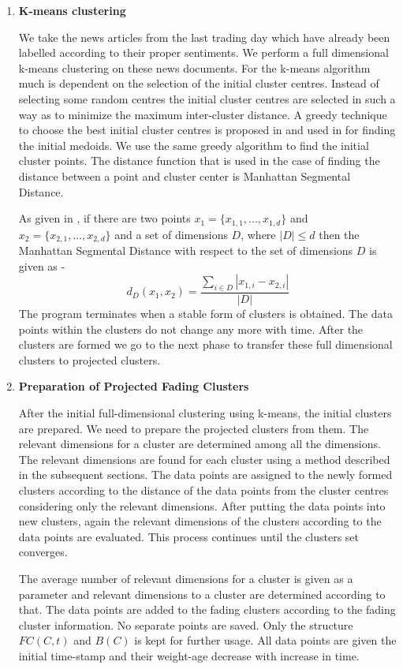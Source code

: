 \documentclass[a4paper,12bp]{report}
\begin{document}
\begin{enumerate}
\item \textbf{K-means clustering}

We take the news articles from the last trading day which have already been labelled according to their proper sentiments. We perform a full dimensional k-means clustering on these news documents. For the k-means algorithm much is dependent on the selection of the initial cluster centres. Instead of selecting some random centres the initial cluster centres are selected in such a way as to minimize the maximum inter-cluster distance. A greedy technique to choose the best initial cluster centres is proposed in \cite{Gonzalez:1985} and used in \cite{Aggarwal:1999} for finding the initial medoids. We use the same greedy algorithm to find the initial cluster points. The distance function that is used in the case of finding the distance between a point and cluster center is Manhattan Segmental Distance. 

As given in \cite{Aggarwal:1999}, if there are two points $x_{1} =\{ x_{1,1}, ..., x_{1,d}\}$ and $x_{2} =\{ x_{2,1}, ..., x_{2,d}\}$ and a set of dimensions $D$, where $|D| \leq d$ then the Manhattan Segmental Distance with respect to the set of dimensions $D$ is given as - 
\begin{equation}
\label{eq:manhattan_seg_distance}
d_{D}(x_1, x_2) = \frac{\sum_{i \in D} |x_{1,i} - x_{2,i}|}{|D|}
\end{equation}
The program terminates when a stable form of clusters is obtained. The data points within the clusters do not change any more with time. After the clusters are formed we go to the next phase to transfer these full dimensional clusters to projected clusters. 

\item \textbf{Preparation of Projected Fading Clusters}

After the initial full-dimensional clustering using k-means, the initial clusters are prepared. We need to prepare the projected clusters from them. The relevant dimensions for a cluster are determined among all the dimensions. The relevant dimensions are found for each cluster using a method described in the subsequent sections. The data points are assigned to the newly formed clusters according to the distance of the data points from the cluster centres considering only the relevant dimensions. After putting the data points into new clusters, again the relevant dimensions of the clusters according to the data points are evaluated. This process continues until the clusters set converges. 

The average number of relevant dimensions for a cluster is given as a parameter and relevant dimensions to a cluster are determined according to that. The data points are added to the fading clusters according to the fading cluster information. No separate points are saved. Only the structure $FC(C,t)$ and $B(C)$ is kept for further usage. All data points are given the initial time-stamp and their weight-age decrease with increase in time.
\end{enumerate}
\end{document}
